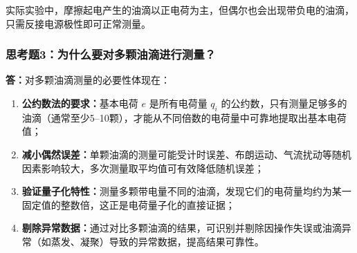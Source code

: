 \documentclass{Phyport}
\begin{document}
实际实验中，摩擦起电产生的油滴以正电荷为主，但偶尔也会出现带负电的油滴，只需反接电源极性即可正常测量。

\subsubsection{思考题3：为什么要对多颗油滴进行测量？}

\textbf{答：}对多颗油滴测量的必要性体现在：

\begin{enumerate}
    \item \textbf{公约数法的要求：}基本电荷 $e$ 是所有电荷量 $q_i$ 的公约数，只有测量足够多的油滴（通常至少5--10颗），才能从不同倍数的电荷量中可靠地提取出基本电荷值；
    \item \textbf{减小偶然误差：}单颗油滴的测量可能受计时误差、布朗运动、气流扰动等随机因素影响较大，多次测量取平均值可有效降低随机误差；
    \item \textbf{验证量子化特性：}测量多颗带电量不同的油滴，发现它们的电荷量均约为某一固定值的整数倍，这正是电荷量子化的直接证据；
    \item \textbf{剔除异常数据：}通过对比多颗油滴的结果，可识别并剔除因操作失误或油滴异常（如蒸发、凝聚）导致的异常数据，提高结果可靠性。
\end{enumerate}


\end{document}

